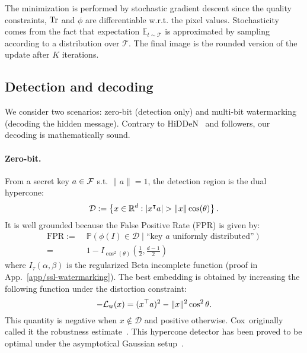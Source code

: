 The minimization is performed by stochastic gradient descent since the quality constraints, $\mathrm{Tr}$ and $\phi$ are differentiable w.r.t. the pixel values.
Stochasticity comes from the fact that
expectation $\mathbb{E}_{t\sim \mathcal T}$ is approximated by sampling according to a distribution over $\mathcal T$.
The final image is the rounded version of the update after $K$ iterations.




\subsection{Detection and decoding}\label{chap1/sec:modulation} 


We consider two scenarios: zero-bit (detection only) and multi-bit watermarking (decoding the hidden message).  
Contrary to HiDDeN~\citep{zhu2018hidden} and followers, our decoding is mathematically sound.

\paragraph*{Zero-bit.}\label{chap1/hd:zero}
From a secret key $a\in\mathcal{F}$ s.t. $\|a\|=1$, the detection region is the dual hypercone:
\begin{equation}
     \mathcal{D} := \left\{  x \in \mathbb{R}^d :  \lvert{ x^\intercal a}\rvert > \lVert{ x}\rVert \cos (\theta) \right\}.
\end{equation}
It is well grounded because the False Positive Rate (FPR) is given by:
\begin{align}
   \mathrm{FPR} :=&\; \mathbb{P}\left(\phi(I)\in \mathcal D \mid \text{``key } a \text{ uniformly distributed''}\right)\nonumber\\
            =&\; 1-I_{\cos^2(\theta)} \left(\frac{1}{2}, \frac{d-1}{2} \right)
   \label{chap1/eq:FPR}
\end{align}
where $I_\tau (\alpha, \beta)$ is the regularized Beta incomplete function (proof in App.~\ref{app/ssl-watermarking}).
The best embedding is obtained by increasing the following function under the distortion constraint:
\begin{equation}
   - \mathcal{L}_{\mathrm{w}}(x) = (x^\top a)^2 -  \|x\|^2 \cos^2\theta.
\end{equation}
This quantity is negative when $x\notin\mathcal{D}$ and positive otherwise.
Cox~\etal originally called it the robustness estimate~\cite[Sec. 5.1.3]{cox2007digital}. 
This hypercone detector has been proved to be optimal under the asymptotical Gaussian setup~\citep{furon2019dualhypercone, merhav2008optimal}.

